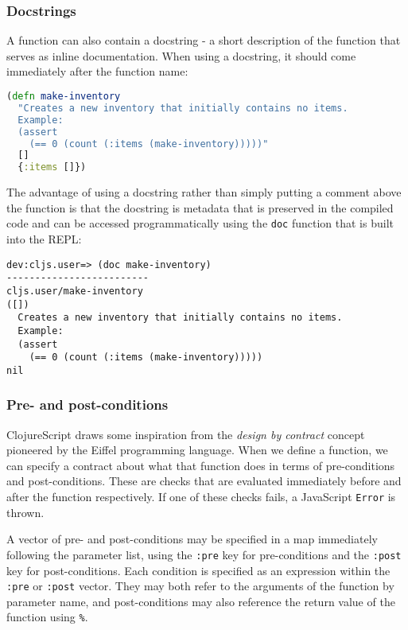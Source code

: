 \documentclass[10pt,twoside,openright]{memoir}
\begin{document}
\subsubsection{Docstrings}

A function can also contain a docstring - a short description of the
function that serves as inline documentation. When using a docstring, it
should come immediately after the function name:

\begin{lstlisting}[language=Clojure, caption={Documenting a function}]
(defn make-inventory
  "Creates a new inventory that initially contains no items.
  Example:
  (assert
    (== 0 (count (:items (make-inventory)))))"
  []
  {:items []})
\end{lstlisting}

The advantage of using a docstring rather than simply putting a comment
above the function is that the docstring is metadata that is preserved
in the compiled code and can be accessed programmatically using the
\texttt{doc} function that is built into the REPL:

\begin{verbatim}
dev:cljs.user=> (doc make-inventory)
-------------------------
cljs.user/make-inventory
([])
  Creates a new inventory that initially contains no items.
  Example:
  (assert
    (== 0 (count (:items (make-inventory)))))
nil
\end{verbatim}


\subsubsection{Pre- and post-conditions}

ClojureScript draws some inspiration from the \emph{design by contract}
concept pioneered by the Eiffel
programming language. When we define a function, we can specify a
contract about what that function does in terms of pre-conditions and
post-conditions. These are checks that are evaluated immediately before
and after the function respectively. If one of these checks fails, a
JavaScript \texttt{Error} is thrown.

A vector of pre- and post-conditions may be specified in a map
immediately following the parameter list, using the \texttt{:pre} key
for pre-conditions and the \texttt{:post} key for post-conditions. Each
condition is specified as an expression within the \texttt{:pre} or
\texttt{:post} vector. They may both refer to the arguments of the
function by parameter name, and post-conditions may also reference the
return value of the function using \texttt{\%}.
\end{document}
